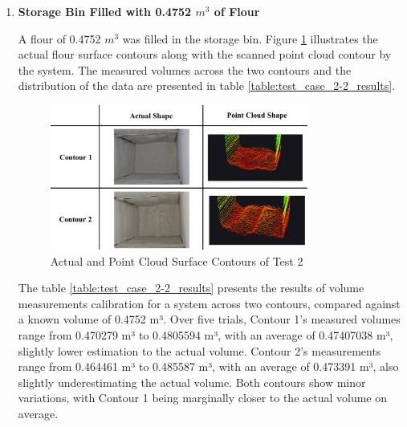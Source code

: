 \begin{enumerate}

	\item \textbf{Storage Bin Filled with 0.4752 $m^3$ of Flour}

	      A flour of 0.4752 $m^3$ was filled in the storage bin. Figure \ref{ch4:fig:test_2-2_contours} illustrates the actual flour surface contours along with the scanned point cloud contour by the system. The measured volumes across the two contours and the distribution of the data are presented in table \ref{table:test_case_2-2_results}. %
	      \\
	      \begin{figure}[H]
		      \centering
		      \includegraphics[width=0.8\textwidth]{Figures/test_2-2_contours}
		      \caption{Actual and Point Cloud Surface Contours of Test 2}
		      \label{ch4:fig:test_2-2_contours}
	      \end{figure}

	      The table \ref{table:test_case_2-2_results} presents the results of volume measurements calibration for a system across two contours, compared against a known volume of 0.4752 m³. Over five trials, Contour 1's measured volumes range from 0.470279 m³ to 0.4805594 m³, with an average of 0.47407038 m³, slightly lower estimation to the actual volume. Contour 2's measurements range from 0.464461 m³ to 0.485587 m³, with an average of 0.473391 m³, also slightly underestimating the actual volume. Both contours show minor variations, with Contour 1 being marginally closer to the actual volume on average. \\


\end{enumerate}
